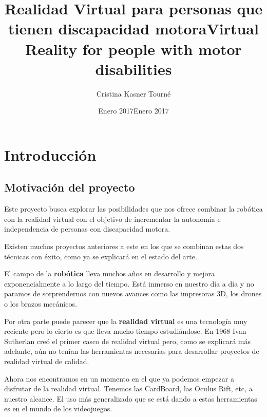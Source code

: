 \documentclass[twoside, 12pt]{epstfg}
\title[spa]{Realidad Virtual para personas que tienen discapacidad motora}
\title[eng]{Virtual Reality for people with motor disabilities}
\author{Cristina Kasner Tourné}
\date[spa]{Enero 2017}
\date[eng]{Enero 2017}
\begin{document}

\frontmatter

\maketitle[spa]

\makeinnertitle[spa]

\makeabstract[spa]
\makeabstract[eng]

\tableofcontents
\clearpage
\listoftables
\clearpage
\listoffigures
\cleardoublepage

\printnoidxglossaries

\mainmatter
\chapter{Introducción} 


\section{Motivación del proyecto}

Este proyecto busca explorar las posibilidades que nos ofrece combinar la robótica con la realidad virtual con el objetivo de incrementar la autonomía e independencia de personas con discapacidad motora.

Existen muchos proyectos anteriores a este en los que se combinan estas dos técnicas con éxito, como ya se explicará en el estado del arte.

El campo de la \textbf{robótica} lleva muchos años en desarrollo y mejora exponencialmente a lo largo del tiempo. Está inmerso en nuestro día a día y no paramos de sorprendernos con nuevos avances como las impresoras 3D, los drones o los brazos mecánicos.

Por otra parte puede parecer que la \textbf{realidad virtual} es una tecnología muy reciente pero lo cierto es que  lleva mucho tiempo estudiándose. En 1968 Ivan Sutherlan creó el primer casco de realidad virtual pero, como se explicará más adelante, aún no tenían las herramientas necesarias para desarrollar proyectos de realidad virtual de calidad.

Ahora nos encontramos en un momento en el que ya podemos empezar a disfrutar de la realidad virtual. Tenemos las CardBoard, las Oculus Rift, etc, a nuestro alcance.
El uso más generalizado que se está dando a estas herramientas es en el mundo de los videojuegos.
\end{document}
